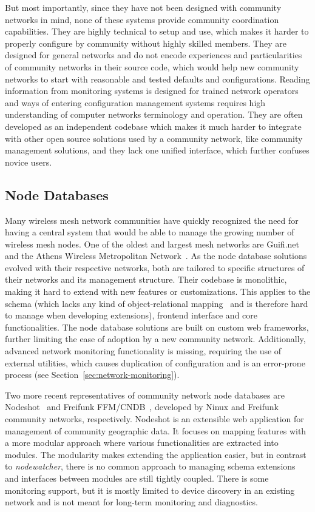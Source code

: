 \documentclass[5p,sort&compress]{elsarticle}
\newcommand{\nodewatcher}{\textit{nodewatcher}}
\begin{document}
But most importantly, since they have not been designed with community networks in mind, none of these systems provide community coordination capabilities.
They are highly technical to setup and use, which makes it harder to properly configure by community without highly skilled members.
They are designed for general networks and do not encode experiences and particularities of community networks in their source code, which would help new community networks to start with reasonable and tested defaults and configurations.
Reading information from monitoring systems is designed for trained network operators and ways of entering configuration management systems requires high understanding of computer networks terminology and operation.
They are often developed as an independent codebase which makes it much harder to integrate with other open source solutions used by a community network, like community management solutions, and they lack one unified interface, which further confuses novice users.

\subsection{Node Databases}

Many wireless mesh network communities have quickly recognized the need for having a central system that would be able to manage the growing number of wireless mesh nodes.
One of the oldest and largest mesh networks are Guifi.net~\cite{Guifinode_2003,Vega_2012} and the Athens Wireless Metropolitan Network~\cite{AWMN_WIND_2002}.
As the node database solutions evolved with their respective networks, both are tailored to specific structures of their networks and its management structure.
Their codebase is monolithic, making it hard to extend with new features or customizations.
This applies to the schema (which lacks any kind of object-relational mapping~\cite{ONeil_2008} and is therefore hard to manage when developing extensions), frontend interface and core functionalities.
The node database solutions are built on custom web frameworks, further limiting the ease of adoption by a new community network.
Additionally, advanced network monitoring functionality is missing, requiring the use of external utilities, which causes duplication of configuration and is an error-prone process (see Section~\ref{sec:network-monitoring}).

Two more recent representatives of community network node databases are Nodeshot~\cite{Nodeshot_2012} and Freifunk FFM/CNDB~\cite{Funkfeuer_2012}, developed by Ninux and Freifunk community networks, respectively.
Nodeshot is an extensible web application for management of community geographic data.
It focuses on mapping features with a more modular approach where various functionalities are extracted into modules.
The modularity makes extending the application easier, but in contrast to \nodewatcher{}, there is no common approach to managing schema extensions and interfaces between modules are still tightly coupled.
There is some monitoring support, but it is mostly limited to device discovery in an existing network and is not meant for long-term monitoring and diagnostics.
\end{document}

